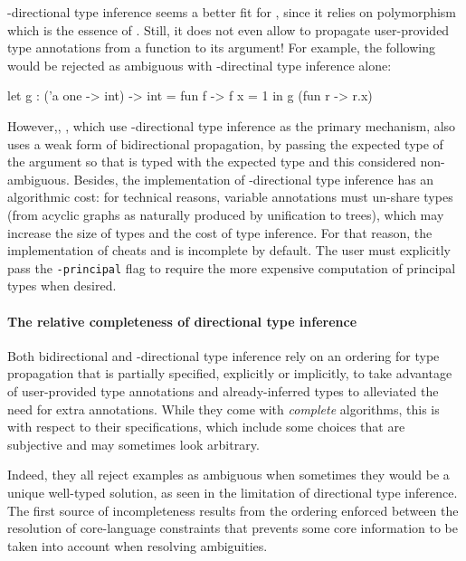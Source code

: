 \documentclass[acmsmall,screen,nonacm]{acmart}
\begin{document}
\Geninst-directional type inference seems a better fit for \ML, since it relies
on polymorphism which is the essence of \ML. Still, it does not even allow
to propagate user-provided type annotations from a function to its argument!
For example, the following would be rejected as ambiguous with
\geninst-directinal type inference alone:
\begin{program}[input]
let g : ('a one -> int) -> int = fun f -> f {x = 1} in g (fun r -> r.x)
\end{program}
However,, \OCaml, which use \geninst-directional type inference as the primary
mechanism, also uses a weak form of bidirectional propagation,
by passing the expected type of the argument so that
 is typed with the expected type
 and this considered non-ambiguous.
%
Besides, the implementation of \geninst-directional type inference has an
algorithmic cost: for technical reasons, variable annotations must un-share
types (from acyclic graphs as naturally produced by unification to trees),
which may increase the size of types and the cost of type inference. For
that reason, the implementation of \OCaml cheats and is incomplete by
default. The user must explicitly pass the \texttt{-principal} flag to
require the more expensive computation of principal types when desired.

\paragraph{The relative completeness of directional type inference}

Both bidirectional and \geninst-directional type inference rely on an
ordering for type propagation that is partially specified, explicitly or
implicitly, to take advantage of user-provided type annotations and
already-inferred types to alleviated the need for extra annotations.
%
While they come with \emph{complete} algorithms, this is with respect to
their specifications, which include some choices that are subjective and may
sometimes look arbitrary.

Indeed, they all reject examples as ambiguous when sometimes they would be a
unique well-typed solution, as seen in the limitation of directional type
inference.  The first source of incompleteness results from the ordering
enforced between the resolution of core-language constraints that prevents
some core information to be taken into account when resolving ambiguities.
\end{document}
